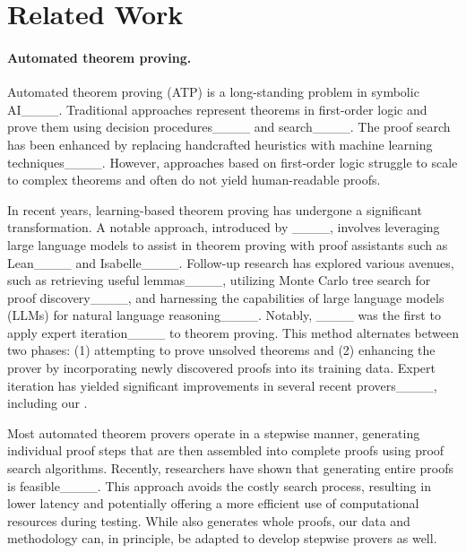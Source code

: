 \section{Related Work}
\paragraph{Automated theorem proving.} 
Automated theorem proving (ATP) is a long-standing problem in symbolic AI____. Traditional approaches represent theorems in first-order logic and prove them using decision procedures____ and search____. The proof search has been enhanced by replacing handcrafted heuristics with machine learning techniques____. However, approaches based on first-order logic struggle to scale to complex theorems and often do not yield human-readable proofs.



In recent years, learning-based theorem proving has undergone a significant transformation. A notable approach, introduced by ____, involves leveraging large language models to assist in theorem proving with proof assistants such as Lean____ and Isabelle____. Follow-up research has explored various avenues, such as retrieving useful lemmas____, utilizing Monte Carlo tree search for proof discovery____, and harnessing the capabilities of large language models (LLMs) for natural language reasoning____. Notably, ____ was the first to apply expert iteration____ to theorem proving. This method alternates between two phases: (1) attempting to prove unsolved theorems and (2) enhancing the prover by incorporating newly discovered proofs into its training data. Expert iteration has yielded significant improvements in several recent provers____, including our {\prover}. 

Most automated theorem provers operate in a stepwise manner, generating individual proof steps that are then assembled into complete proofs using proof search algorithms. Recently, researchers have shown that generating entire proofs is feasible____. This approach avoids the costly search process, resulting in lower latency and potentially offering a more efficient use of computational resources during testing. While {\prover} also generates whole proofs, our data and methodology can, in principle, be adapted to develop stepwise provers as well.


